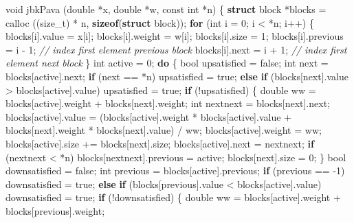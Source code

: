 \documentclass[
  12pt,
]{book}
\newenvironment{Shaded}{\begin{snugshade}}{\end{snugshade}}
\newcommand{\CommentTok}[1]{\textcolor[rgb]{0.56,0.35,0.01}{\textit{#1}}}
\newcommand{\ControlFlowTok}[1]{\textcolor[rgb]{0.13,0.29,0.53}{\textbf{#1}}}
\newcommand{\DataTypeTok}[1]{\textcolor[rgb]{0.13,0.29,0.53}{#1}}
\newcommand{\DecValTok}[1]{\textcolor[rgb]{0.00,0.00,0.81}{#1}}
\newcommand{\KeywordTok}[1]{\textcolor[rgb]{0.13,0.29,0.53}{\textbf{#1}}}
\newcommand{\NormalTok}[1]{#1}
\theoremstyle{definition}
\theoremstyle{definition}
\theoremstyle{definition}
\theoremstyle{definition}
\theoremstyle{remark}
\begin{document}
\begin{Shaded}
\begin{Highlighting}[]
\DataTypeTok{void}\NormalTok{ jbkPava (}\DataTypeTok{double}\NormalTok{ *x, }\DataTypeTok{double}\NormalTok{ *w, }\DataTypeTok{const} \DataTypeTok{int}\NormalTok{ *n) \{}
    \KeywordTok{struct}\NormalTok{ block *blocks = calloc ((}\DataTypeTok{size\_t}\NormalTok{) * n, }\KeywordTok{sizeof}\NormalTok{(}\KeywordTok{struct}\NormalTok{ block));}
    \ControlFlowTok{for}\NormalTok{ (}\DataTypeTok{int}\NormalTok{ i = }\DecValTok{0}\NormalTok{; i \textless{} *n; i++) \{}
\NormalTok{        blocks[i].value = x[i];}
\NormalTok{        blocks[i].weight = w[i];}
\NormalTok{        blocks[i].size = }\DecValTok{1}\NormalTok{;}
\NormalTok{        blocks[i].previous = i {-} }\DecValTok{1}\NormalTok{; }\CommentTok{// index first element previous block}
\NormalTok{        blocks[i].next = i + }\DecValTok{1}\NormalTok{;     }\CommentTok{// index first element next block}
\NormalTok{    \}}
    \DataTypeTok{int}\NormalTok{ active = }\DecValTok{0}\NormalTok{;}
    \ControlFlowTok{do}\NormalTok{ \{}
        \DataTypeTok{bool}\NormalTok{ upsatisfied = false;}
        \DataTypeTok{int}\NormalTok{ next = blocks[active].next;}
        \ControlFlowTok{if}\NormalTok{ (next == *n) upsatisfied = true;}
        \ControlFlowTok{else} \ControlFlowTok{if}\NormalTok{ (blocks[next].value \textgreater{} blocks[active].value) upsatisfied = true;}
        \ControlFlowTok{if}\NormalTok{ (!upsatisfied) \{}
            \DataTypeTok{double}\NormalTok{ ww = blocks[active].weight + blocks[next].weight;}
            \DataTypeTok{int}\NormalTok{ nextnext = blocks[next].next;}
\NormalTok{            blocks[active].value = (blocks[active].weight * blocks[active].value + blocks[next].weight * blocks[next].value) / ww;}
\NormalTok{            blocks[active].weight = ww;}
\NormalTok{            blocks[active].size += blocks[next].size;}
\NormalTok{            blocks[active].next = nextnext;}
            \ControlFlowTok{if}\NormalTok{ (nextnext \textless{} *n)}
\NormalTok{                blocks[nextnext].previous = active;}
\NormalTok{            blocks[next].size = }\DecValTok{0}\NormalTok{;}
\NormalTok{        \}}
        \DataTypeTok{bool}\NormalTok{ downsatisfied = false;}
        \DataTypeTok{int}\NormalTok{ previous = blocks[active].previous;}
        \ControlFlowTok{if}\NormalTok{ (previous == {-}}\DecValTok{1}\NormalTok{) downsatisfied = true;}
        \ControlFlowTok{else} \ControlFlowTok{if}\NormalTok{ (blocks[previous].value \textless{} blocks[active].value) downsatisfied = true;}
        \ControlFlowTok{if}\NormalTok{ (!downsatisfied) \{}
            \DataTypeTok{double}\NormalTok{ ww = blocks[active].weight + blocks[previous].weight;}

\end{Highlighting}
\end{Shaded}
\end{document}
